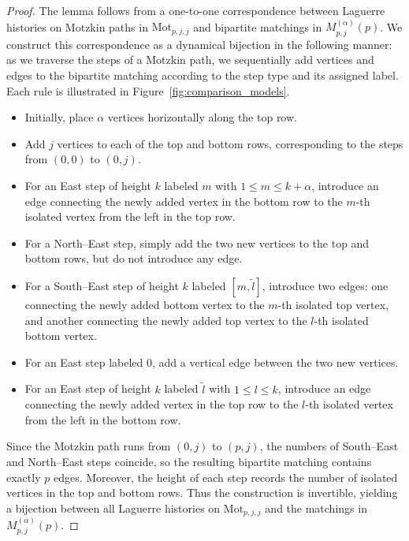\documentclass{amsart}
\theoremstyle{plain}
\theoremstyle{remark}
\numberwithin{equation}{section}
\begin{document}
\begin{proof}
The lemma follows from a one-to-one correspondence between Laguerre 
histories on Motzkin paths in $\mathrm{Mot}_{p,j,j}$ and bipartite 
matchings in $M_{p,j}^{(\alpha)}(p)$. 
We construct this correspondence as a dynamical bijection in the 
following manner: as we traverse the steps of a Motzkin path, we 
sequentially add vertices and edges to the bipartite matching according 
to the step type and its assigned label. Each rule is illustrated in  Figure~\ref{fig:comparison_models}. 
\begin{itemize}
    \item[(S1)] Initially, place $\alpha$ vertices horizontally along the top row.  
        \smallskip 
    \item[(S2)] Add $j$ vertices to each of the top and bottom rows, 
        corresponding to the steps from $(0,0)$ to $(0,j)$. 
        \smallskip 
    \item[(S3)] For an East step of height $k$ labeled $m$ with 
        $1 \le m \le k+\alpha$, introduce an edge connecting the newly 
        added vertex in the bottom row to the $m$-th isolated vertex from 
        the left in the top row.  
    \smallskip
    \item[(S4)] For a North–East step, simply add the two new vertices to the top and bottom rows, but do not introduce any edge.  
    \smallskip 
    \item[(S5)] For a South--East step of height $k$ labeled 
        $[m,\widetilde{l}]$, introduce two edges: one connecting the newly 
        added bottom vertex to the $m$-th isolated top vertex, and another 
        connecting the newly added top vertex to the $l$-th isolated bottom vertex. 
        \smallskip 
        \item[(S6)] For an East step labeled $0$, add a vertical edge between the two new vertices. 
        \smallskip 
        \item[(S7)] For an East step of height $k$ labeled $\widetilde{l}$ with $1 \le l \le k$, introduce an edge connecting the newly added vertex in the top row to the $l$-th isolated vertex from the left in the bottom row. 
\end{itemize}

Since the Motzkin path runs from $(0,j)$ to $(p,j)$, the numbers of 
South--East and North--East steps coincide, so the resulting bipartite 
matching contains exactly $p$ edges. Moreover, the height of each step 
records the number of isolated vertices in the top and bottom rows. 
Thus the construction is invertible, yielding a bijection between all 
Laguerre histories on $\mathrm{Mot}_{p,j,j}$ and the matchings in 
$M_{p,j}^{(\alpha)}(p)$.
\end{proof} 
\end{document}
